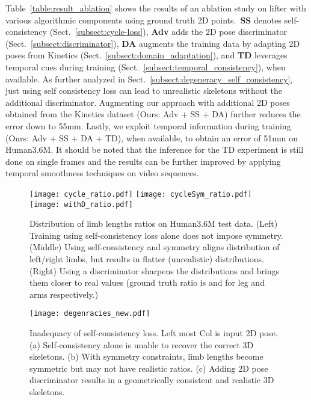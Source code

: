 \documentclass[10pt,twocolumn,letterpaper]{article}
\begin{document}
Table~\ref{table:result_ablation} shows the results of an ablation study on lifter with various algorithmic components using ground truth 2D points.~\textbf{SS} denotes self-consistency (Sect.~\ref{subsect:cycle-loss}),  \textbf{Adv} adds the 2D pose discriminator (Sect.~\ref{subsect:discriminator}), \textbf{DA} augments the training data by adapting 2D poses from Kinetics (Sect.~\ref{subsect:domain_adaptation}), and \textbf{TD} leverages temporal cues during training (Sect.~\ref{subsect:temporal_consistency}), when available. As further analyzed in Sect.~\ref{subsect:degeneracy_self_consistency}, just using self consistency loss can lead to unrealistic skeletons without the additional discriminator. Augmenting our approach with additional 2D poses obtained from the Kinetics dataset (Ours: Adv + SS + DA) further reduces the error down to 55mm. Lastly, we exploit temporal information during training (Ours: Adv + SS + DA + TD), when available, to obtain an error of 51mm on Human3.6M. It should be noted that the inference for the TD experiment is still done on single frames and the results can be further improved by applying temporal smoothness techniques on video sequences.
\begin{figure*}[htb]
	\centering
\texttt{[image: cycle\_ratio.pdf]}
	\texttt{[image: cycleSym\_ratio.pdf]}
	\texttt{[image: withD\_ratio.pdf]}
	\caption{Distribution of limb lengths ratios on Human3.6M test data. (Left) Training using self-consistency loss alone does not impose symmetry. (Middle) Using self-consistency and symmetry aligns distribution of left/right limbs, but results in flatter (unrealistic) distributions. (Right) Using a discriminator sharpens the distributions and brings them closer to real values (ground truth ratio is  and  for leg and arms respectively.) }
	\label{fig:selfAnalysis}
\vspace{-4ex}
\end{figure*}
\begin{figure}[htb!]
\centering
\texttt{[image: degenracies\_new.pdf]}
\caption{Inadequacy of self-consistency loss. Left most Col is input 2D pose. (a) Self-consistency alone is unable to recover the correct 3D skeletons. (b) With symmetry constraints, limb lengths become symmetric but may not have realistic ratios. (c) Adding 2D pose discriminator results in a geometrically consistent and realistic 3D skeletons.}
\label{fig:self_consistency_example}
\end{figure}
\end{document}
